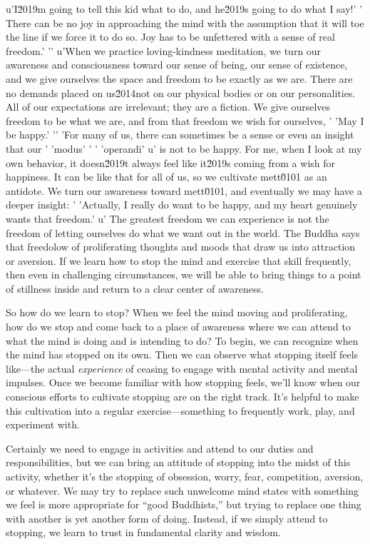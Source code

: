 u'I\u2019m going to tell this kid what to do, and he\u2019s going to do what I say!'
' There can be no joy in approaching the mind with the assumption that it will toe the line if we force it to do so. Joy has to be unfettered with a sense of real freedom.'
'\n'
u'When we practice loving-kindness meditation, we turn our awareness and consciousness toward our sense of being, our sense of existence, and we give ourselves the space and freedom to be exactly as we are. There are no demands placed on us\u2014not on our physical bodies or on our personalities. All of our expectations are irrelevant; they are a fiction. We give ourselves freedom to be what we are, and from that freedom we wish for ourselves, '
'May I be happy.'
'\n'
'For many of us, there can sometimes be a sense or even an insight that our '
'modus'
' '
'operandi'
u' is not to be happy. For me, when I look at my own behavior, it doesn\u2019t always feel like it\u2019s coming from a wish for happiness. It can be like that for all of us, so we cultivate mett\u0101 as an antidote. We turn our awareness toward mett\u0101, and eventually we may have a deeper insight: '
'Actually, I really do want to be happy, and my heart genuinely wants that freedom.'
u' The greatest freedom we can experience is not the freedom of letting ourselves do what we want out in the world. The Buddha says that freedolow of proliferating thoughts and moods that draw us into 
attraction or aversion. If we learn how to stop the mind and exercise 
that skill frequently, then even in challenging circumstances, we will 
be able to bring things to a point of stillness inside and return to a 
clear center of awareness.

So how do we learn to stop? When we feel the mind moving and 
proliferating, how do we stop and come back to a place of awareness 
where we can attend to what the mind is doing and is intending to do? 
To begin, we can recognize when the mind has stopped on its own. Then 
we can observe what stopping itself feels like---the actual 
\emph{experience} of ceasing to engage with mental activity and mental 
impulses. Once we become familiar with how stopping feels, we'll know 
when our conscious efforts to cultivate stopping are on the right 
track. It's helpful to make this cultivation into a regular 
exercise---something to frequently work, play, and experiment with.

Certainly we need to engage in activities and attend to our duties and 
responsibilities, but we can bring an attitude of stopping into the 
midst of this activity, whether it's the stopping of obsession, worry, 
fear, competition, aversion, or whatever. We may try to replace such 
unwelcome mind states with something we feel is more appropriate for 
``good Buddhists,'' but trying to replace one thing with another is yet 
another form of doing. Instead, if we simply attend to stopping, we 
learn to trust in fundamental clarity and wisdom.

